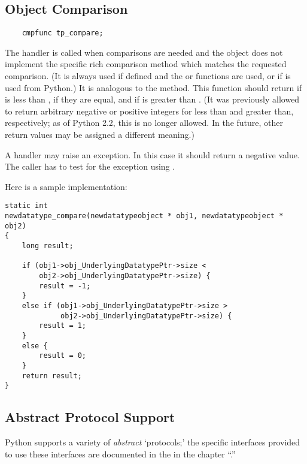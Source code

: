 \subsection{Object Comparison}

\begin{verbatim}
    cmpfunc tp_compare;
\end{verbatim}

The  handler is called when comparisons are needed
and the object does not implement the specific rich comparison method
which matches the requested comparison.  (It is always used if defined
and the  or 
functions are used, or if  is used from Python.)
It is analogous to the  method.  This function
should return  if  is less than
,  if they are equal, and  if
 is greater than
.
(It was previously allowed to return arbitrary negative or positive
integers for less than and greater than, respectively; as of Python
2.2, this is no longer allowed.  In the future, other return values
may be assigned a different meaning.)

A  handler may raise an exception.  In this case it
should return a negative value.  The caller has to test for the
exception using .


Here is a sample implementation:

\begin{verbatim}
static int
newdatatype_compare(newdatatypeobject * obj1, newdatatypeobject * obj2)
{
    long result;

    if (obj1->obj_UnderlyingDatatypePtr->size <
        obj2->obj_UnderlyingDatatypePtr->size) {
        result = -1;
    }
    else if (obj1->obj_UnderlyingDatatypePtr->size >
             obj2->obj_UnderlyingDatatypePtr->size) {
        result = 1;
    }
    else {
        result = 0;
    }
    return result;
}
\end{verbatim}


\subsection{Abstract Protocol Support}

Python supports a variety of \emph{abstract} `protocols;' the specific
interfaces provided to use these interfaces are documented in the
 in the
chapter ``.''

